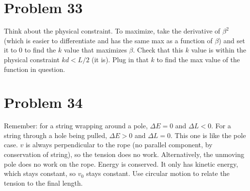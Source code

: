 \documentclass[11pt]{article}
\begin{document}
\section*{Problem 33}
Think about the physical constraint. To maximize, take the derivative of $\beta^2$ (which is easier to differentiate and has the same max as a function of $\beta$) and set it to $0$ to find the $k$ value that maximizes $\beta$. Check that this $k$ value is within the physical constraint $kd<L/2$ (it is). Plug in that $k$ to find the max value of the function in question.

\section*{Problem 34}
Remember: for a string wrapping around a pole, $\Delta E=0$ and $\Delta L<0$. For a string through a hole being pulled, $\Delta E>0$ and $\Delta L=0$.
This one is like the pole case. $v$ is always perpendicular to the rope (no parallel component, by conservation of string), so the tension does no work. Alternatively, the unmoving pole does no work on the rope. Energy is conserved. It only has kinetic energy, which stays constant, so $v_0$ stays constant. Use circular motion to relate the tension to the final length.
\end{document}
